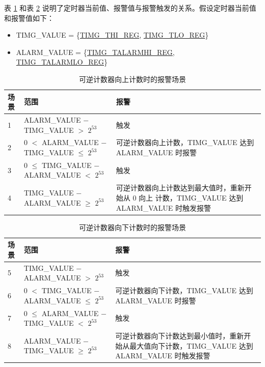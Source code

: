 \documentclass[main\_\_CN.tex]{subfiles}
\begin{document}
表 \ref{tab:timg-alarm-generation-up} 和表 \ref{tab:timg-alarm-generation-down} 说明了定时器当前值、报警值与报警触发的关系。假设定时器当前值和报警值如下：

\begin{itemize}
    \item TIMG\_VALUE = \{\hyperref[regdesc:TIMGTXHIREG]{TIMG\_THI\_REG}, \hyperref[regdesc:TIMGTXLOREG]{TIMG\_TLO\_REG}\}
    \item ALARM\_VALUE = \{\hyperref[regdesc:TIMGTXALARMHIREG]{TIMG\_TALARMHI\_REG}, \hyperref[regdesc:TIMGTXALARMLOREG]{TIMG\_TALARMLO\_REG}\}
\end{itemize}


\begin{table}[H]
\centering
\caption{可逆计数器向上计数时的报警场景}
\label{tab:timg-alarm-generation-up}

\begin{tabular}{|l|l|m{7cm}|}
\hline
\rowcolor{lightgray}
    \textbf{场景} & \textbf{范围} & \textbf{报警} \\\hline
     1 & ALARM\_VALUE $-$ TIMG\_VALUE $>$ $2^{53}$ & 触发 \\\hline
     2 & 0 $<$ ALARM\_VALUE $-$ TIMG\_VALUE $\leq$ $2^{53}$ & 可逆计数器向上计数，TIMG\_VALUE 达到 ALARM\_VALUE 时报警 \\\hline
     3 & 0 $\leq$ TIMG\_VALUE $-$ ALARM\_VALUE $<$ $2^{53}$ & 触发 \\\hline
     4 & TIMG\_VALUE $-$ ALARM\_VALUE $\geq$ $2^{53}$ & 可逆计数器向上计数达到最大值时，重新开始从 0 向上 计数，TIMG\_VALUE 达到 ALARM\_VALUE 时触发报警\\\hline

\end{tabular}
\end{table}

\begin{table}[H]
\centering
\caption{可逆计数器向下计数时的报警场景}
\label{tab:timg-alarm-generation-down}

\begin{tabular}{|l|l|m{7cm}|}
\hline
\rowcolor{lightgray}
    \textbf{场景} & \textbf{范围} & \textbf{报警} \\\hline
     5 & TIMG\_VALUE $-$ ALARM\_VALUE  $>$ $2^{53}$ & 触发 \\\hline
     6 &  0 $<$ TIMG\_VALUE $-$ ALARM\_VALUE $\leq$ $2^{53}$ & 可逆计数器向下计数，TIMG\_VALUE 达到 ALARM\_VALUE 时报警 \\\hline
     7 & 0 $\leq$ ALARM\_VALUE $-$ TIMG\_VALUE $<$ $2^{53}$ & 触发 \\\hline
     8 & ALARM\_VALUE $-$ TIMG\_VALUE $\geq$ $2^{53}$ & 可逆计数器向下计数达到最小值时，重新开始从最大值向下计数，TIMG\_VALUE 达到 ALARM\_VALUE 时触发报警 \\\hline

\end{tabular}
\end{table}
\end{document}
